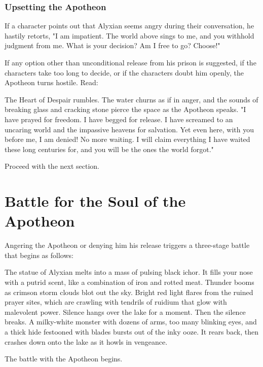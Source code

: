 \documentclass[letterpaper, 11pt, bg=full, twocolumn]{dndbook}
\begin{document}
\subsubsection{Upsetting the Apotheon}

If a character points out that Alyxian seems angry during their conversation, he hastily retorts, "I am impatient. The world above sings to me, and you withhold judgment from me. What is your decision? Am I free to go? Choose!"

If any option other than unconditional release from his prison is suggested, if the characters take too long to decide, or if the characters doubt him openly, the Apotheon turns hostile. Read:

\begin{DndReadAloud}
The Heart of Despair rumbles. The water churns as if in anger, and the sounds of breaking glass and cracking stone pierce the space as the Apotheon speaks. "I have prayed for freedom. I have begged for release. I have screamed to an uncaring world and the impassive heavens for salvation. Yet even here, with you before me, I am denied! No more waiting. I will claim everything I have waited these long centuries for, and you will be the ones the world forgot."
\end{DndReadAloud}

Proceed with the next section.
\section{Battle for the Soul of the Apotheon}

Angering the Apotheon or denying him his release triggers a three-stage battle that begins as follows:

\begin{DndReadAloud}
The statue of Alyxian melts into a mass of pulsing black ichor. It fills your nose with a putrid scent, like a combination of iron and rotted meat. Thunder booms as crimson storm clouds blot out the sky. Bright red light flares from the ruined prayer sites, which are crawling with tendrils of ruidium that glow with malevolent power. Silence hangs over the lake for a moment.
Then the silence breaks. A milky-white monster with dozens of arms, too many blinking eyes, and a thick hide festooned with blades bursts out of the inky ooze. It rears back, then crashes down onto the lake as it howls in vengeance.
\end{DndReadAloud}

The battle with the Apotheon begins.
\end{document}
